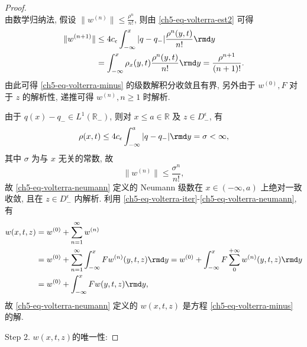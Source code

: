 \begin{proof}
\begin{equation}
    \end{equation}
    由数学归纳法, 假设 $ \|w^{(n)}\| \leq \frac{\rho^{n}}{n!} $, 则由 \eqref{ch5-eq-volterra-est2} 可得
    \begin{equation}
        \begin{aligned}
            \|w^{(n+1)}\| & \leq 4 c_{\epsilon} \int_{-\infty}^{x} |q -q_{-}| \frac{\rho^{n}(y,t)}{n!} \rmd y               \\
                          & = \int_{-\infty}^{x} \rho_{x}(y,t) \frac{\rho^{n}(y,t)}{n!} \rmd y = \frac{\rho^{n+1}}{(n+1)!}.
        \end{aligned}
    \end{equation}
    由此可得 \eqref{ch5-eq-volterra-minus} 的级数解积分收敛且有界, 另外由于 $ w^{(0)}, F$ 对于 $z$ 的解析性, 递推可得 $ w^{(n)}, n \geq 1 $ 时解析.

    由于 $ q(x) - q_{-} \in L^{1}(\mathbb{R}_{-}) $, 则对 $ x \leq a \in \mathbb{R}$ 及 $ z \in D_{-}^{\epsilon} $, 有
    \begin{equation}
        \rho(x,t) \leq 4 c_{\epsilon} \int_{-\infty}^{a} |q-q_{-}| \rmd y = \sigma < \infty,
    \end{equation}
    其中 $ \sigma $ 为与 $ x$ 无关的常数, 故
    \begin{equation}
        \|w^{(n)}\| \leq \frac{\sigma^{n}}{n!},
    \end{equation}
    故 \eqref{ch5-eq-volterra-neumann} 定义的 Neumann 级数在 $ x \in (-\infty,a) $ 上绝对一致收敛, 且在 $ z \in D_{-}^{\epsilon} $ 内解析.
    利用 \eqref{ch5-eq-volterra-iter}-\eqref{ch5-eq-volterra-neumann}, 有
    \begin{equation}
        \begin{aligned}
            w(x,t,z) & = w^{(0)} + \sum_{n=1}^{\infty} w^{(n)}                                                                                                              \\
                     & = w^{(0)} + \sum_{n=1}^{\infty} \int_{-\infty}^{x} F w^{(n)}(y,t,z) \rmd y = w^{(0)} + \int_{-\infty}^{x} F \sum_{0}^{+\infty} w^{(n)}(y,t,z) \rmd y \\
                     & = w^{(0)} + \int_{-\infty}^{x} F w(y,t,z) \rmd y,
        \end{aligned}
    \end{equation}
    故 \eqref{ch5-eq-volterra-neumann} 定义的 $ w(x,t,z) $ 是方程 \eqref{ch5-eq-volterra-minus} 的解.

    Step 2. $w(x,t,z)$的唯一性:


\end{proof}
